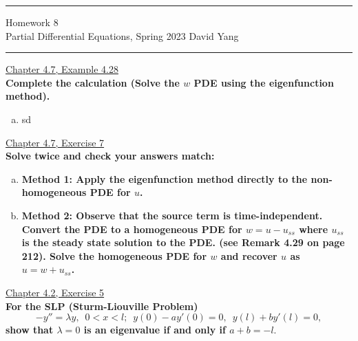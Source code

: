 \documentclass[11pt]{article}
\begin{document}
	\hrule
	\begin{center}
		{\Large Homework 8} \\ %
		\vspace{0.2cm}
		Partial Differential Equations, Spring 2023 \hfill David Yang %
	\end{center}

\hrule

\vspace{1em}


\underline{Chapter 4.7, Example 4.28} \\

\textbf{Complete the calculation (Solve the $w$ PDE using the eigenfunction method).}

\begin{enumerate}[(a)]
    \item sd
\end{enumerate}

\underline{Chapter 4.7, Exercise 7} \\

\textbf{Solve twice and check your answers match:}

\begin{enumerate}[(a)]
    \item \textbf{Method 1: Apply the eigenfunction method directly to the non-homogeneous PDE for $u$.}
    \item \textbf{Method 2: Observe that the source term is time-independent. Convert the PDE to a homogeneous PDE for $w = u - u_{ss}$ where $u_{ss}$ is the steady state solution to the PDE.
    (see Remark 4.29 on page 212). Solve the homogeneous PDE for $w$ and recover $u$ as $u = w + u_{ss}$.}
\end{enumerate}

\newpage

\underline{Chapter 4.2, Exercise 5} \\

\textbf{For the SLP (Sturm-Liouville Problem)} \[-y'' = \lambda y, \, \, \, 0 < x < l; \, \, \, y(0) - ay'(0) = 0, \, \, \, y(l) + by'(l) = 0,\]
\textbf{show that $\lambda = 0$ is an eigenvalue if and only if $a+b = -l.$} \\
\end{document}
